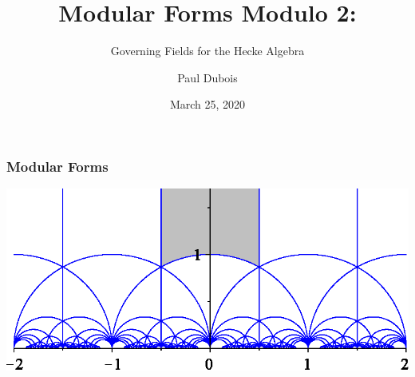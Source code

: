 \documentclass[12pt]{beamer}
\begin{document}
	\author{Paul Dubois}
	\title{Modular Forms Modulo 2:}
	\subtitle{Governing Fields for the Hecke Algebra}
	\date{March 25, 2020}
	\subject{Mathematics}
	\begin{frame}[plain]
		\maketitle
	\end{frame}
	
	\begin{frame}
		\frametitle{Modular Forms}
		\begin{center}
			\includegraphics{ModularGroup-FundamentalDomain.eps}
		\end{center}
	\end{frame}
\end{document}
